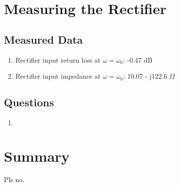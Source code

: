 \documentclass{article}
\begin{document}
\section{Measuring the Rectifier}

\subsection{Measured Data}

\begin{enumerate}
	\item Rectifier input return loss at $\omega = \omega_0$: -0.47 dB
	\item Rectifier input impedance at $\omega = \omega_0$: 10.07 - j122.6 $\Omega$
\end{enumerate}

\subsection{Questions}

\begin{enumerate}
	\item
\end{enumerate}

\section{Summary}
Pls no.
\end{document}
